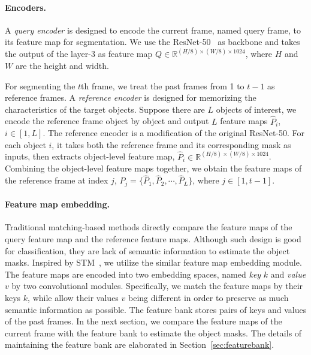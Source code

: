 \documentclass{article}
\begin{document}
\paragraph{Encoders.}
A \emph{query encoder} is designed to encode the current frame, named query frame, to its feature map for segmentation.
We use the ResNet-50~\cite{he_deep_2016} as backbone and takes the output of the layer-3 as  feature map $Q \in \mathbb{R}^{(H/8)\times (W/8) \times 1024}$, where $H$ and $W$ are the height and width.

For segmenting the $t$th frame, we treat the past frames from 1 to $t-1$ as reference frames.
A \emph{reference encoder} is designed for memorizing the characteristics of the target objects.
Suppose there are $L$ objects of interest, we encode the reference frame object by object and output $L$ feature maps $\hat{P}_i$, $i \in [1, L]$.
The reference encoder is a modification of the original ResNet-50.
For each object $i$, it takes both the reference frame and its corresponding mask as inputs, then extracts object-level feature map, $\hat{P}_i \in \mathbb{R}^{(H/8)\times (W/8) \times 1024}$.
Combining the object-level feature maps together, we obtain the feature maps of the reference frame at index $j$, $P_j = \{\hat{P}_1, \hat{P}_2, \cdots, \hat{P}_L\}$, where $j \in [1, t-1]$.

\paragraph{Feature map embedding.}
Traditional matching-based methods directly compare the feature maps of the query feature map and the reference feature maps. 
Although such design is good for classification, they are lack of semantic information to estimate the object masks.
Inspired by STM~\cite{oh_video_2019}, we utilize the similar feature map embedding module.
The feature maps are encoded into two embedding spaces, named \emph{key} $k$ and \emph{value} $v$ by two convolutional modules.
Specifically, we match the feature maps by their keys $k$, while allow their values $v$ being different in order to preserve as much semantic information as possible.
The feature bank stores pairs of keys and values of the past frames.
In the next section, we compare the feature maps of the current frame with the feature bank to estimate the object masks.
The details of maintaining the feature bank are elaborated in Section~\ref{sec:featurebank}.
\end{document}
